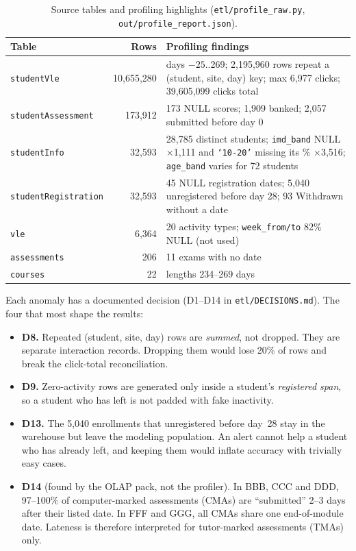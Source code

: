 \documentclass[10pt,letterpaper]{article}
\renewcommand{\tt}[1]{\texttt{#1}}
\begin{document}
\begin{table}[H]\centering\small
\caption{Source tables and profiling highlights (\tt{etl/profile\_raw.py}, \tt{out/profile\_report.json}).}\label{tab:src}
\begin{tabular}{@{}lrp{4.3in}@{}}
\toprule
\textbf{Table} & \textbf{Rows} & \textbf{Profiling findings} \\ \midrule
\tt{studentVle} & 10,655,280 & days $-25$..269; 2,195,960 rows repeat a (student, site, day) key; max 6,977 clicks; 39,605,099 clicks total \\
\tt{studentAssessment} & 173,912 & 173 NULL scores; 1,909 banked; 2,057 submitted before day 0 \\
\tt{studentInfo} & 32,593 & 28,785 distinct students; \tt{imd\_band} NULL ×1,111 and \tt{`10-20'} missing its \% ×3,516; \tt{age\_band} varies for 72 students \\
\tt{studentRegistration} & 32,593 & 45 NULL registration dates; 5,040 unregistered before day 28; 93 Withdrawn without a date \\
\tt{vle} & 6,364 & 20 activity types; \tt{week\_from/to} 82\% NULL (not used) \\
\tt{assessments} & 206 & 11 exams with no date \\
\tt{courses} & 22 & lengths 234--269 days \\
\bottomrule
\end{tabular}
\end{table}
Each anomaly has a documented decision (D1--D14 in \tt{etl/DECISIONS.md}). The four that most shape the results:
\begin{itemize}
\item \textbf{D8.} Repeated (student, site, day) rows are \emph{summed}, not dropped. They are separate
interaction records. Dropping them would lose 20\% of rows and break the click-total reconciliation.
\item \textbf{D9.} Zero-activity rows are generated only inside a student's \emph{registered span}, so a student
who has left is not padded with fake inactivity.
\item \textbf{D13.} The 5,040 enrollments that unregistered before day~28 stay in the warehouse but leave the
modeling population. An alert cannot help a student who has already left, and keeping them would inflate accuracy
with trivially easy cases.
\item \textbf{D14} (found by the OLAP pack, not the profiler). In BBB, CCC and DDD, 97--100\% of computer-marked
assessments (CMAs) are ``submitted'' 2--3 days after their listed date. In FFF and GGG, all CMAs share one
end-of-module date. Lateness is therefore interpreted for tutor-marked assessments (TMAs) only.
\end{itemize}
\end{document}
